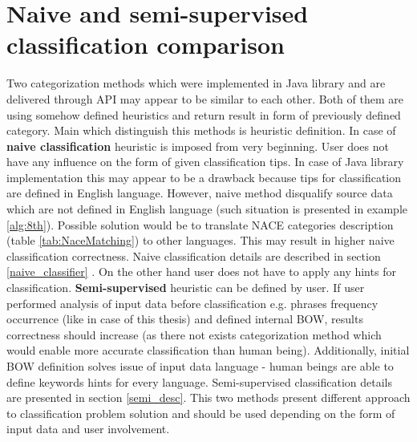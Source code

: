 \section{Naive and semi-supervised classification comparison}
Two categorization methods which were implemented in Java library and are delivered through API may appear to be similar to each other. Both of them are using somehow defined heuristics and return result in form of previously defined category. Main which distinguish this methods is heuristic definition. In case of \textbf{naive classification} heuristic is imposed from very beginning. User does not have any influence on the form of given classification tips. In case of Java library implementation this may appear to be a drawback because tips for classification are defined in English language. However, naive method disqualify source data which are not defined in English language (such situation is presented in example \ref{alg:8th}). Possible solution would be to translate NACE categories description (table \ref{tab:NaceMatching}) to other languages. This may result in higher naive classification correctness. Naive classification details are described in section \ref{naive_classifier} . On the other hand user does not have to apply any hints for classification. \textbf{Semi-supervised} heuristic can be defined by user. If user performed analysis of input data before classification e.g. phrases frequency occurrence (like in case of this thesis) and defined internal BOW, results correctness should increase (as there not exists categorization method which would enable more accurate classification than human being). Additionally, initial BOW definition solves issue of input data language - human beings are able to define keywords hints for every language. Semi-supervised classification details are presented in section \ref{semi_desc}. This two methods present different approach to classification problem solution and should be used depending on the form of input data and user involvement.
 
